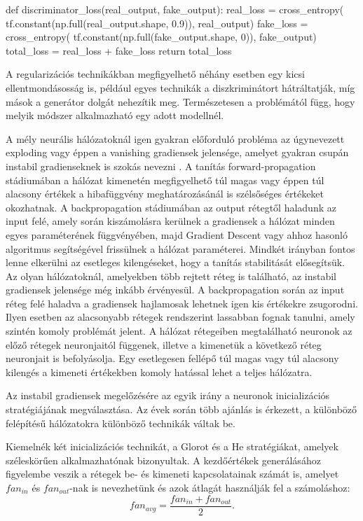 \begin{python}
	def discriminator_loss(real_output, fake_output):
	real_loss = cross_entropy(
	tf.constant(np.full(real_output.shape, 0.9)),
	real_output)
	fake_loss = cross_entropy(
	tf.constant(np.full(fake_output.shape, 0)),
	fake_output)
	total_loss = real_loss + fake_loss
	return total_loss
\end{python}

A regularizációs technikákban megfigyelhető néhány esetben egy kicsi ellentmondásosság is, például egyes technikák a diszkriminátort hátráltatják, míg mások a generátor dolgát nehezítik meg. Természetesen a problémától függ, hogy melyik módszer alkalmazható egy adott modellnél.



A mély neurális hálózatoknál igen gyakran előforduló probléma az úgynevezett exploding vagy éppen a vanishing gradiensek jelensége, amelyet gyakran csupán instabil gradienseknek is szokás nevezni \cite{geron2019hands}.
A tanítás forward-propagation stádiumában a hálózat kimenetén megfigyelhető túl magas vagy éppen túl alacsony értékek a hibafüggvény meghatározásánál is szélsőséges értékeket okozhatnak.
A backpropagation stádiumában az output rétegtől haladunk az input felé, amely során kiszámolásra kerülnek a gradiensek a hálózat minden egyes paraméterének függvényében, majd Gradient Descent vagy ahhoz hasonló algoritmus segítségével frissülnek a hálózat paraméterei. Mindkét irányban fontos lenne elkerülni az esetleges kilengéseket, hogy a tanítás stabilitását elősegítsük.
Az olyan hálózatoknál, amelyekben több rejtett réteg is található, az instabil gradiensek jelensége még inkább érvényesül. A backpropagation során az input réteg felé haladva a gradiensek hajlamosak lehetnek igen kis értékekre zsugorodni. Ilyen esetben az alacsonyabb rétegek rendszerint lassabban fognak tanulni, amely szintén komoly problémát jelent.
A hálózat rétegeiben megtalálható neuronok az előző rétegek neuronjaitól függenek, illetve a kimenetük a következő réteg neuronjait is befolyásolja. Egy esetlegesen fellépő túl magas vagy túl alacsony kilengés a kimeneti értékekben komoly hatással lehet a teljes hálózatra.

Az instabil gradiensek megelőzésére az egyik irány a neuronok inicializációs stratégiájának megválasztása.
Az évek során több ajánlás is érkezett, a különböző felépítésű hálózatokra különböző technikák váltak be.

Kiemelnék két inicializációs technikát, a Glorot \cite{glorot2010understanding} és a He \cite{he2015delving} stratégiákat, amelyek széleskörűen alkalmazhatónak bizonyultak.
A kezdőértékek generálásához figyelembe veszik a rétegek be- és kimeneti kapcsolatainak számát is, amelyet $fan_{in}$ és $fan_{out}$-nak is nevezhetünk és azok átlagát használják fel a számoláshoz:
$$fan_{avg} = \frac{fan_{in} + fan_{out}}{2}.$$

